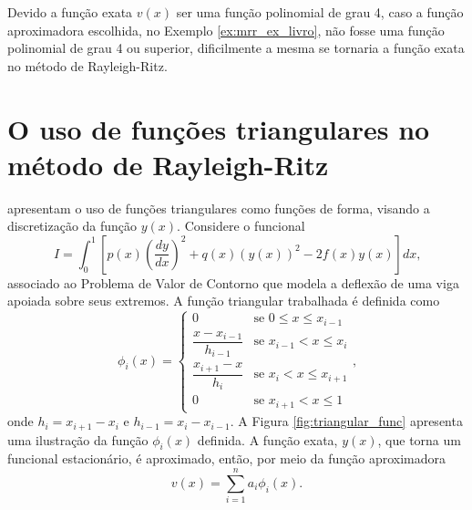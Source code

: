 \documentclass[
	12pt,				%
	openright,			%
    twoside,			%
	a4paper,			%
	chapter=TITLE,		%
	english,			%
	french,				%
	spanish,			%
	brazil				%
	]{abntex2}
\numberwithin{lema}{chapter}
\numberwithin{teorema}{chapter}
\numberwithin{definicao}{chapter}
\numberwithin{exemplo}{chapter}
\numberwithin{figure}{chapter}
\begin{document}
Devido a função exata $v(x)$ ser uma função polinomial de grau 4, caso a função aproximadora escolhida, no Exemplo \ref{ex:mrr_ex_livro}, não fosse uma função polinomial de grau 4 ou superior, dificilmente a mesma se tornaria a função exata no método de Rayleigh-Ritz.

\section{O uso de funções triangulares no método de Rayleigh-Ritz}
\label{sec:mrr_triangular}

 apresentam o uso de funções triangulares como funções de forma, visando a discretização da função $y(x)$. Considere o funcional
\begin{equation}
	\label{eqn:cap_metodo_ray_ritz:tri_func_funcional}
	I = \int_{0}^{1} \left [ 
		p(x) \left ( 
			\frac{dy}{dx}
		\right )^2
		+ q(x)(y(x))^2 
		- 2f(x)y(x) 
	\right ] dx
	\text{,}
\end{equation}
associado ao Problema de Valor de Contorno que modela a deflexão de uma viga apoiada sobre seus extremos. A função triangular trabalhada é definida como
\begin{equation}
	\label{eqn:cap_metodo_ray_ritz:tri_func_phi}
	\phi_i (x) = 
		\begin{cases}
			0 							& \mbox{se } 0 \leqslant x \leqslant x_{i - 1}\\[5pt]
			\dfrac{x-x_{i-1}}{h_{i-1}} 	& \mbox{se } x_{i-1} < x \leqslant x_i\\[10pt]
			\dfrac{x_{i+1}-x}{h_i}		& \mbox{se } x_i < x \leqslant x_{i+1}\\[5pt]
			0							& \mbox{se } x_{i+1}<x\leqslant 1
		\end{cases}
	\text{,}
\end{equation}
onde $h_i = x_{i+1}-x_{i}$ e $h_{i-1}=x_i-x_{i-1}$. A Figura \ref{fig:triangular_func} apresenta uma ilustração da função $\phi_i(x)$ definida. A função exata, $y(x)$, que torna um funcional estacionário, é aproximado, então, por meio da função aproximadora
\begin{equation}
	\label{eqn:cap_metodo_ray_ritz:tri_func_app_v}
	v(x)=\sum_{i=1}^{n} a_i \phi_i(x)
	\text{.}
\end{equation}
\end{document}
